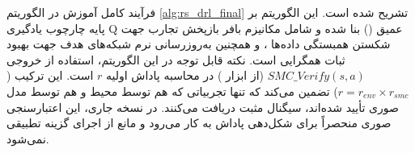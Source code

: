 \documentclass[oneside,openany,phd]{TMU-Thesis}
\begin{document}
فرآیند کامل آموزش در الگوریتم \ref{alg:rs_drl_final} تشریح شده است. این الگوریتم بر پایه چارچوب یادگیری Q عمیق () \cite{mnih2015human} بنا شده و شامل مکانیزم بافر بازپخش تجارب جهت شکستن همبستگی داده‌ها \cite{mnih2015human}، و همچنین به‌روزرسانی نرم شبکه‌های هدف \cite{lillicrap2015continuous} جهت بهبود ثبات همگرایی است. نکته قابل توجه در این الگوریتم، استفاده از خروجی $SMC\_Verify(s, a)$ (از ابزار  \cite{david2015uppaal}) در محاسبه پاداش اولیه $r$ است. این ترکیب ($r = r_{env} \times r_{smc}$) تضمین می‌کند که تنها تجربیاتی که هم توسط محیط و هم توسط مدل صوری تأیید شده‌اند، سیگنال مثبت دریافت می‌کنند. در نسخه جاری، این اعتبارسنجی صوری منحصراً برای شکل‌دهی پاداش به کار می‌رود و مانع از اجرای گزینه تطبیقی نمی‌شود.
\end{document}
